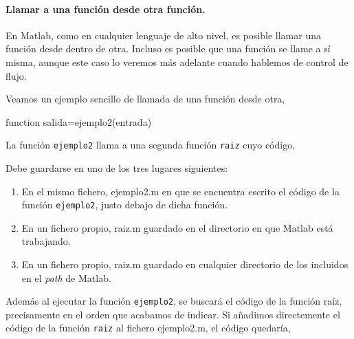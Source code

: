 \paragraph{Llamar a una función desde otra función.}
En Matlab, como en cualquier lenguaje de alto nivel, es posible llamar una función desde dentro de otra. Incluso es posible que una función se llame a sí misma, aunque este caso lo veremos más adelante cuando hablemos de control de flujo. 

Veamos un ejemplo sencillo de llamada de una función desde otra,

function salida=ejemplo2(entrada)



La función \texttt{ejemplo2} llama a una segunda función \texttt{raiz} cuyo código,


Debe guardarse en uno de los tres lugares siguientes:
\begin{enumerate}
\item En el mismo fichero, ejemplo2.m en que se encuentra escrito el código de la función \texttt{ejemplo2}, justo debajo de dicha función.
\item En un fichero propio, raiz.m guardado en el directorio en que Matlab está trabajando.
\item En un fichero propio, raiz.m guardado en cualquier directorio de los incluidos en el \emph{path} de Matlab.
\end{enumerate}

Además al ejecutar la función \texttt{ejemplo2}, se buscará el código de la función raíz, precisamente en el orden que acabamos de indicar. Si añadimos directemente el código de la función \texttt{raiz} al fichero ejemplo2.m, el código quedaría,


